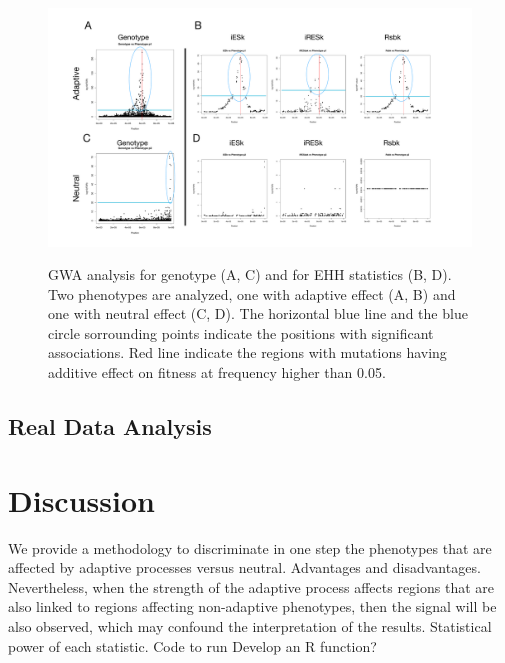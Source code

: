 \documentclass[a4paper,11pt]{article}
\begin{document}
\begin{figure}[h]
{\includegraphics[scale=0.2]{./Example_EHHstatsGWAS.pdf}}
\caption{GWA analysis for genotype (A, C) and for EHH statistics (B, D). Two phenotypes are analyzed, one with adaptive effect (A, B) and one with neutral effect (C, D). The horizontal blue line and the blue circle sorrounding points indicate the positions with significant associations. Red line indicate the regions with mutations having additive effect on fitness at frequency higher than 0.05.}
\label{Example_EHHstatsGWAS}
\hspace*{-0.5cm}
\end{figure}

\subsection{Real Data Analysis}

\section{Discussion}

We provide a methodology to discriminate in one step the phenotypes that are affected by adaptive processes versus neutral. 
Advantages and disadvantages. Nevertheless, when the strength of the adaptive process affects regions that are also linked to regions affecting non-adaptive phenotypes, then the signal will be also observed, which may confound the interpretation of the results.
Statistical power of each statistic. 
Code to run
Develop an R function?



\end{document}
